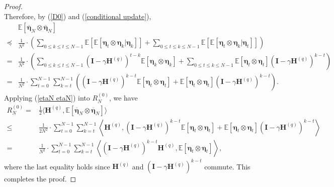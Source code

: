 \documentclass[11pt, letterpaper]{article}
\begin{document}
\begin{proof}
\begin{equation}
    \end{equation}
    Therefore, by (\ref{D0}) and (\ref{conditional update}),
    \begin{equation}
    \label{etaN etaN}
        \begin{aligned}
            & \mathbb{E}[\overline{\boldsymbol{\eta}}_{N}\otimes\overline{\boldsymbol{\eta}}_{N}] \\
            \preceq &\frac{1}{N^2}\cdot\left(\sum_{0\leq k\leq t\leq N-1}\mathbb{E}\left[\mathbb{E}[\boldsymbol{\eta}_t\otimes\boldsymbol{\eta}_k|\boldsymbol{\eta}_k]\right]+\sum_{0\leq t\leq k\leq N-1}\mathbb{E}\left[\mathbb{E}[\boldsymbol{\eta}_t\otimes\boldsymbol{\eta}_k|\boldsymbol{\eta}_t]\right]\right)\\
            =&\frac{1}{N^2}\cdot\left(\sum_{0\leq k\leq t\leq N-1}(\mathbf{I}-\gamma\mathbf{H}^{(q)})^{t-k}\mathbb{E}[\boldsymbol{\eta}_k\otimes\boldsymbol{\eta}_k]+\sum_{0\leq t\leq k\leq N-1}\mathbb{E}[\boldsymbol{\eta}_t\otimes\boldsymbol{\eta}_t](\mathbf{I}-\gamma\mathbf{H}^{(q)})^{k-t}\right) \\
            =&\frac{1}{N^2}\cdot\sum_{t=0}^{N-1}\sum_{k=t}^{N-1}\left((\mathbf{I}-\gamma\mathbf{H}^{(q)})^{k-t}\mathbb{E}[\boldsymbol{\eta}_t\otimes\boldsymbol{\eta}_t]+\mathbb{E}[\boldsymbol{\eta}_t\otimes\boldsymbol{\eta}_t](\mathbf{I}-\gamma\mathbf{H}^{(q)})^{k-t}\right).
        \end{aligned}
    \end{equation}
    Applying (\ref{etaN etaN}) into $R_N^{(0)}$, we have
    \begin{equation*}
        \begin{aligned}
            R_N^{(0)}=&\frac{1}{2}\langle\mathbf{H}^{(q)},\mathbb{E}[\overline{\boldsymbol{\eta}}_N\otimes\overline{\boldsymbol{\eta}}_N]\rangle\\
            \leq&\frac{1}{2N^2}\cdot\sum_{t=0}^{N-1}\sum_{k=t}^{N-1}\left\langle\mathbf{H}^{(q)},(\mathbf{I}-\gamma\mathbf{H}^{(q)})^{k-t}\mathbb{E}[\boldsymbol{\eta}_t\otimes\boldsymbol{\eta}_t]+\mathbb{E}[\boldsymbol{\eta}_t\otimes\boldsymbol{\eta}_t](\mathbf{I}-\gamma\mathbf{H}^{(q)})^{k-t}\right\rangle \\
            =&\frac{1}{N^2}\cdot\sum_{t=0}^{N-1}\sum_{k=t}^{N-1}\left\langle(\mathbf{I}-\gamma\mathbf{H}^{(q)})^{k-t}\mathbf{H}^{(q)},\mathbb{E}[\boldsymbol{\eta}_t\otimes\boldsymbol{\eta}_t]\right\rangle,
        \end{aligned}
    \end{equation*}
    where the last equality holds since $\mathbf{H}^{(q)}$ and $(\mathbf{I}-\gamma\mathbf{H}^{(q)})^{k-t}$ commute. This completes the proof.
\end{proof}
\end{document}
